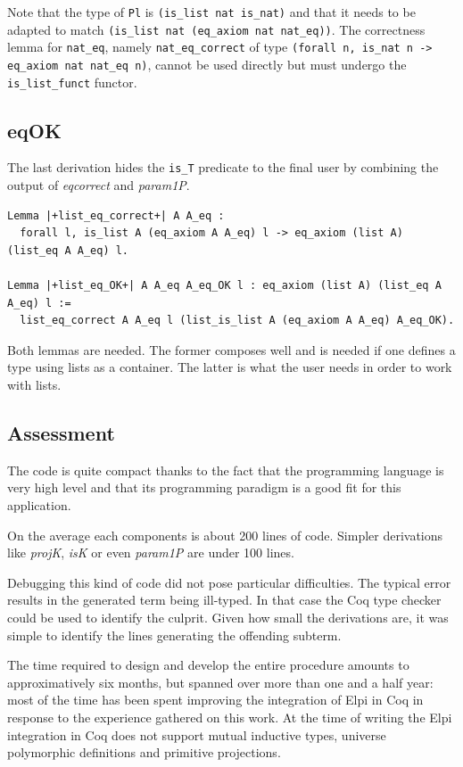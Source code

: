 \documentclass[a4paper,UKenglish,cleveref, autoref]{lipics-v2019}
\newcommand{\derive}[1]{\emph{#1}}
\begin{document}
\noindent
Note that the type of \lstinline+Pl+ is
\lstinline+(is_list nat is_nat)+ and that it
needs to be adapted to match
\lstinline+(is_list nat (eq_axiom nat nat_eq))+.
The correctness lemma for \lstinline+nat_eq+, namely \lstinline+nat_eq_correct+ of type
\lstinline+(forall n, is_nat n -> eq_axiom nat nat_eq n)+, cannot be used directly
but must undergo the \lstinline+is_list_funct+ functor.

\subsection{eqOK} %

The last derivation hides the \lstinline+is_T+ predicate
to the final user by combining the output of
\derive{eqcorrect} and \derive{param1P}.
\begin{lstlisting}
Lemma |+list_eq_correct+| A A_eq :
  forall l, is_list A (eq_axiom A A_eq) l -> eq_axiom (list A) (list_eq A A_eq) l.

Lemma |+list_eq_OK+| A A_eq A_eq_OK l : eq_axiom (list A) (list_eq A A_eq) l :=
  list_eq_correct A A_eq l (list_is_list A (eq_axiom A A_eq) A_eq_OK).
\end{lstlisting}

\noindent
Both lemmas are needed. The former composes well
and is needed if one defines a type using lists as a container.
The latter is what the user needs in order to work with lists.

\subsection{Assessment} %

The code is quite compact thanks to the fact that the programming
language is very high level and that its programming paradigm is a good
fit for this application.

On the average each components is about 200 lines of code.
Simpler derivations like \derive{projK}, \derive{isK} or even
\derive{param1P} are under 100 lines.

Debugging this kind of code did not pose particular difficulties.
The typical error results in the generated term being ill-typed.
In that case the Coq type checker could be used to identify the
culprit. Given how small the derivations are, it was simple to identify
the lines generating the offending subterm.

The time required to design and develop the entire procedure amounts
to approximatively six months, but spanned over more than one and a
half year: most of the time has been spent improving the integration
of Elpi in Coq in response to the experience gathered on this work.
At the time of writing the Elpi integration in Coq does not support
mutual inductive types, universe polymorphic definitions and primitive
projections.
\end{document}
